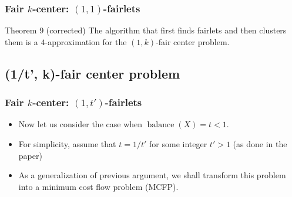 \documentclass{beamer}
\DeclareMathOperator{\balance}{balance}
\begin{document}


\begin{frame}
\frametitle{Fair $k$-center: $(1, 1)$-fairlets}

\begin{block}{Theorem 9 (corrected)}
The algorithm that first finds fairlets and then clusters them is a \alert{$4$}-approximation for the $(1, k)$-fair center problem.

\end{block}

\end{frame}


\subsection{(1/t', k)-fair center problem}

\begin{frame}
\frametitle{Fair $k$-center: $(1, t')$-fairlets}

\begin{itemize}
	\item Now let us consider the case when $\balance(X) = t < 1$. \pause
	
	\item For simplicity, assume that $t = 1/t'$ for some integer $t' > 1$ (as done in the paper) \pause
	
	\item As a generalization of previous argument, we shall transform this problem into a \alert{minimum cost flow problem (MCFP)}.
\end{itemize}

\end{frame}

\end{document}
